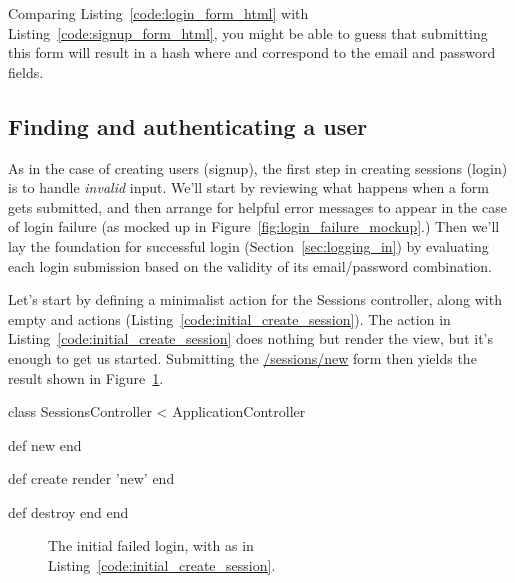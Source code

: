 \noindent Comparing Listing~\ref{code:login_form_html} with Listing~\ref{code:signup_form_html}, you might be able to guess that submitting this form will result in a  hash where  and  correspond to the e\-mail and password fields.


    \subsection{Finding and authenticating a user} %
    \label{sec:finding_and_authenticating_a_user}

As in the case of creating users (signup), the first step in creating sessions (login) is to handle \emph{invalid} input. We'll start by reviewing what happens when a form gets submitted, and then arrange for helpful error messages to appear in the case of login failure (as mocked up in Figure~\ref{fig:login_failure_mockup}.) Then we'll lay the foundation for successful login (Section~\ref{sec:logging_in}) by evaluating each login submission based on the validity of its email/password combination.

Let's start by defining a minimalist  action for the Sessions controller, along with empty  and  actions (Listing~\ref{code:initial_create_session}). The  action in Listing~\ref{code:initial_create_session} does nothing but render the  view, but it's enough to get us started. Submitting the \href{http://localhost:3000/sessions/new}{/sessions/new} form then yields the result shown in Figure~\ref{fig:initial_failed_login_rails_3}.

\begin{codelisting}
\label{code:initial_create_session}
\begin{code}
class SessionsController < ApplicationController

  def new
  end

  def create
    render 'new'
  end

  def destroy
  end
end
\end{code}
\end{codelisting}

\begin{figure}
\begin{center}
\end{center}
\caption{The initial failed login, with  as in Listing~\ref{code:initial_create_session}.\label{fig:initial_failed_login_rails_3}}
\end{figure}

